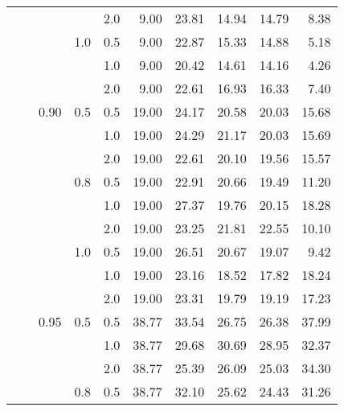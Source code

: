 \documentclass{article}
\begin{document}
{\begin{tabular}{lllllrrrrr}
            &     &      &     & 2.0 &    9.00 &   23.81 &             14.94 &                14.79 &       8.38 \\
            &     &      & 1.0 & 0.5 &    9.00 &   22.87 &             15.33 &                14.88 &       5.18 \\
            &     &      &     & 1.0 &    9.00 &   20.42 &             14.61 &                14.16 &       4.26 \\
            &     &      &     & 2.0 &    9.00 &   22.61 &             16.93 &                16.33 &       7.40 \\
            &     & 0.90 & 0.5 & 0.5 &   19.00 &   24.17 &             20.58 &                20.03 &      15.68 \\
            &     &      &     & 1.0 &   19.00 &   24.29 &             21.17 &                20.03 &      15.69 \\
            &     &      &     & 2.0 &   19.00 &   22.61 &             20.10 &                19.56 &      15.57 \\
            &     &      & 0.8 & 0.5 &   19.00 &   22.91 &             20.66 &                19.49 &      11.20 \\
            &     &      &     & 1.0 &   19.00 &   27.37 &             19.76 &                20.15 &      18.28 \\
            &     &      &     & 2.0 &   19.00 &   23.25 &             21.81 &                22.55 &      10.10 \\
            &     &      & 1.0 & 0.5 &   19.00 &   26.51 &             20.67 &                19.07 &       9.42 \\
            &     &      &     & 1.0 &   19.00 &   23.16 &             18.52 &                17.82 &      18.24 \\
            &     &      &     & 2.0 &   19.00 &   23.31 &             19.79 &                19.19 &      17.23 \\
            &     & 0.95 & 0.5 & 0.5 &   38.77 &   33.54 &             26.75 &                26.38 &      37.99 \\
            &     &      &     & 1.0 &   38.77 &   29.68 &             30.69 &                28.95 &      32.37 \\
            &     &      &     & 2.0 &   38.77 &   25.39 &             26.09 &                25.03 &      34.30 \\
            &     &      & 0.8 & 0.5 &   38.77 &   32.10 &             25.62 &                24.43 &      31.26 \\

\end{tabular}}
\end{document}
